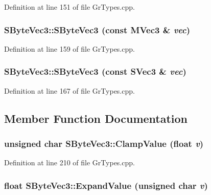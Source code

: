 Definition at line 151 of file GrTypes.cpp.\hypertarget{struct_s_byte_vec3_2bdfc0f62f2e795a1f975b41663fefe7}{
\subsubsection[{SByteVec3}]{\setlength{\rightskip}{0pt plus 5cm}SByteVec3::SByteVec3 (const {\bf MVec3} \& {\em vec})}}
\label{struct_s_byte_vec3_2bdfc0f62f2e795a1f975b41663fefe7}




Definition at line 159 of file GrTypes.cpp.\hypertarget{struct_s_byte_vec3_5a1ecf2144ee07a0eac71d4aa3bf9a4f}{
\subsubsection[{SByteVec3}]{\setlength{\rightskip}{0pt plus 5cm}SByteVec3::SByteVec3 (const {\bf SVec3} \& {\em vec})}}
\label{struct_s_byte_vec3_5a1ecf2144ee07a0eac71d4aa3bf9a4f}




Definition at line 167 of file GrTypes.cpp.

\subsection{Member Function Documentation}
\hypertarget{struct_s_byte_vec3_d5ff95d8fb95b7ef2abd7cbb94612bdf}{
\subsubsection[{ClampValue}]{\setlength{\rightskip}{0pt plus 5cm}unsigned char SByteVec3::ClampValue (float {\em v})}}
\label{struct_s_byte_vec3_d5ff95d8fb95b7ef2abd7cbb94612bdf}




Definition at line 210 of file GrTypes.cpp.\hypertarget{struct_s_byte_vec3_b119526770f65b889e2fc32ad23180b0}{
\subsubsection[{ExpandValue}]{\setlength{\rightskip}{0pt plus 5cm}float SByteVec3::ExpandValue (unsigned char {\em v})}}
\label{struct_s_byte_vec3_b119526770f65b889e2fc32ad23180b0}




